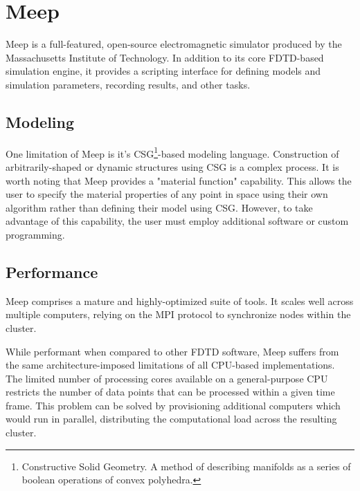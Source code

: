 \chapter{Meep} \label{ch:meep}

Meep\cite{OskooiRo10} is a full-featured, open-source electromagnetic simulator produced by the Massachusetts Institute of Technology. In addition to its core FDTD-based simulation engine, it provides a scripting interface for defining models and simulation parameters, recording results, and other tasks.  





\section{Modeling}

\iffalse
************************************************
While I may agree, you need to keep they hyperbole and sarcasm out.  You should re-write this section to state what Meep is, how it is used, and how you made use of some of it's features.  You can also look up how many citations it has (on their website) to showcase that it's widely used and trusted making it a valid point of comparison 
************************************************
\fi

One limitation of Meep is it's CSG\footnote{Constructive Solid Geometry. A method of describing manifolds as a series of boolean operations of convex polyhedra.}-based modeling language. Construction of arbitrarily-shaped or dynamic structures using CSG is a complex process. It is worth noting that Meep provides a "material function" capability. This allows the user to specify the material properties of any point in space using their own algorithm rather than defining their model using CSG. However, to take advantage of this capability, the user must employ additional software or custom programming. 

\section{Performance}

Meep comprises a mature and highly-optimized suite of tools. It scales well across multiple computers, relying on the MPI protocol to synchronize nodes within the cluster.

While performant when compared to other FDTD software, Meep suffers from the same architecture-imposed limitations of all CPU-based implementations. The limited number of processing cores available on a general-purpose CPU restricts the number of data points that can be processed within a given time frame. This problem can be solved by provisioning additional computers which would run in parallel, distributing the computational load across the resulting cluster.

